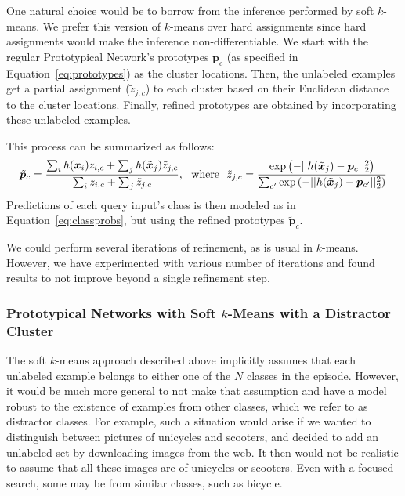 One natural choice would be to borrow from the inference performed by soft $k$-means. We prefer this
version of $k$-means over hard assignments since hard assignments would make the inference 
non-differentiable.  We start with the regular Prototypical Network's prototypes $\bm{p}_{c}$ (as
specified in Equation~\ref{eq:prototypes}) as the cluster locations. Then, the unlabeled examples
get a partial assignment ($\tilde{z}_{j,c}$) to each cluster based on their Euclidean distance to
the cluster locations. Finally, refined  prototypes are obtained by incorporating these unlabeled
examples.

This process can be summarized as follows:
\begin{align}
    \tilde{\bm{p}}_c = \frac{\sum_i h(\bm{x}_i) z_{i,c} + \sum_j h(\tilde{\bm{x}}_j) \tilde{z}_{j,c}}
    {\sum_i z_{i,c} + \sum_j \tilde{z}_{j,c}}, ~~{\rm where }~~
    \tilde{z}_{j,c} = \frac{\exp \left(-||h(\tilde{\bm{x}}_j) - \bm{p}_c||^2_2 \right)}
    {\sum_{c'} \exp \left(-||h(\tilde{\bm{x}}_j) - \bm{p}_{c'}||^2_2 \right) } \label{eq:softassign}
\end{align}
Predictions of each query input's class is then modeled as in Equation~\ref{eq:classprobs}, but 
using the refined prototypes $\tilde{\bm{p}}_c$.

We could perform several iterations of refinement, as is usual in $k$-means. However, we have
experimented with various number of iterations and found results to not improve beyond a single
refinement step.

\subsubsection{Prototypical Networks with Soft $k$-Means with a Distractor Cluster}
The soft $k$-means approach described above implicitly assumes that each unlabeled example belongs
to either one of the $N$ classes in the episode. However, it would be much more general to not make
that assumption and have a model robust to the existence of examples from other classes, which we
refer to as distractor classes. For example, such a situation would arise if we wanted to distinguish
between pictures of unicycles and scooters, and decided to add an unlabeled set  by downloading
images from the web. It then would not be realistic to assume that all these images are of unicycles
or scooters. Even with a focused search, some may be from similar classes, such as bicycle.

